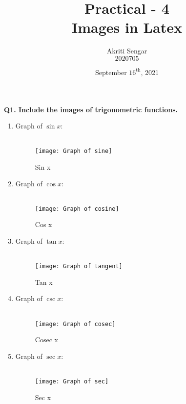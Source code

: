 \documentclass{article}
\title{\textbf{Practical - 4}\\Images in Latex}
\author{Akriti Sengar \\ $2020705$}
\date{September $16^{\text{th}}$, 2021}
\begin{document}
	\maketitle

\noindent \textbf{Q1. Include the images of trigonometric functions.}\\
\begin{enumerate}
	\item Graph of $\sin x $:\\\\
	\begin{figure}[h!]
		\begin{center}
			\texttt{[image: Graph of sine]}
		\end{center}
		\caption{Sin x}
		\label{sin x}
	\end{figure}

\item Graph of $\cos x $:\\\\
\begin{figure}[h!]
	\begin{center}
		\texttt{[image: Graph of cosine]}
	\end{center}
	\caption{Cos x}
	\label{cos x}
\end{figure}

\item Graph of $\tan x $:\\\\
\begin{figure}[h!]
	\begin{center}
		\texttt{[image: Graph of tangent]}
	\end{center}
	\caption{Tan x}
	\label{tan x}
\end{figure}

\item Graph of $\csc x $:\\\\
\begin{figure}[h!]
	\begin{center}
		\texttt{[image: Graph of cosec]}
	\end{center}
	\caption{Cosec x}
	\label{cosec x}
\end{figure}

\item Graph of $\sec x $:\\\\
\begin{figure}[h!]
	\begin{center}
		\texttt{[image: Graph of sec]}
	\end{center}
	\caption{Sec x}
	\label{sec x}
\end{figure}


\end{enumerate}
\end{document}
